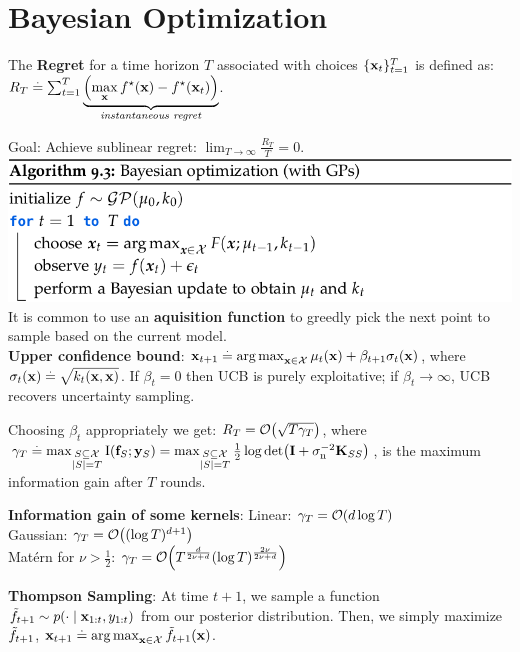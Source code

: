 \section{Bayesian Optimization}
\begin{framed}
    The \textbf{Regret} for a time horizon $T$ associated with choices $\{\mathbf{x}_t\}_{t=1}^T$ is defined as: $R_T \overset{.}{=} \sum_{t=1}^T \underbrace{\left({\max_{\mathbf{x}} f^\star(\mathbf{x}) - f^\star(\mathbf{x}_t)}\right)}_{\text{\textit{instantaneous regret}}}$.
\end{framed}
Goal: Achieve sublinear regret: $\lim_{T\to\infty} \frac{R_T}{T} = 0$.
\includegraphics[width=0.98\linewidth,trim={0 0 3cm 0}]{images/Bayesian_Optimization.png}
It is common to use an \textbf{aquisition function} to greedly pick the next point to sample based on the current model. \\
\textbf{Upper confidence bound}: $\mathbf{x}_{t+1} \overset{.}{=} \operatorname*{arg\,max}_{\mathbf{x} \in \mathcal{X}} \mu_{t}(\mathbf{x}) + \beta_{t+1} \sigma_{t}(\mathbf{x})$, where $\sigma_t(\mathbf{x}) \overset{.}{=} \sqrt{k_t(\mathbf{x}, \mathbf{x})}$. If $\beta_t = 0$ then UCB is purely exploitative; if $\beta_t \to \infty$, UCB recovers uncertainty sampling.
\begin{framed}
    Choosing $\beta_t$ appropriately we get: $R_T = \BigO{\sqrt{T \gamma_T}}$, where $\gamma_T \defeq \max_{\substack{\sS \subseteq \spX \\ \card{\sS} = T}} \I{\vf_\sS}{\vy_\sS} = \max_{\substack{\sS \subseteq \spX \\ |\sS| = T}} \frac{1}{2} \log\det{\mI + \sigman^{-2} \mK_{\sS\sS}}$, is the maximum information gain after $T$ rounds.
\end{framed}
\begin{framed}
    \textbf{Information gain of some kernels}:
    Linear: $\gamma_T = \BigO{d \log T}$ \\
    Gaussian: $\gamma_T = \BigO{(\log T)^{d+1}}$ \\
    Matérn for $\nu > \frac{1}{2}$: $\gamma_T = \BigO{T^{\frac{d}{2\nu + d}} (\log T)^{\frac{2\nu}{2\nu + d}}}$
\end{framed}
\textbf{Thompson Sampling}: At time $t+1$, we sample a function $\Tilde{f}_{t+1} \sim p(\cdot \mid \mathbf{x}_{1:t}, y_{1:t})$ from our posterior distribution.
Then, we simply maximize $\Tilde{f}_{t+1}$, $\mathbf{x}_{t+1} \overset{.}{=} \operatorname*{arg\,max}_{\mathbf{x} \in \mathcal{X}} \Tilde{f}_{t+1}(\mathbf{x})$.
